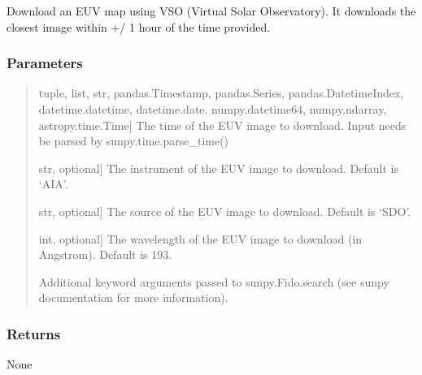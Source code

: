 \documentclass[letterpaper,10pt,english]{sphinxmanual}
\begin{document}
\begin{fulllineitems}
\begin{fulllineitems}
\end{fulllineitems}


\begin{fulllineitems}
\label{\detokenize{pycatch/pycatch:pycatch.pycatch.pycatch.download}}
\pysigstartsignatures
{}
\pysigstopsignatures
\sphinxAtStartPar
Download an EUV map using VSO (Virtual Solar Observatory). It downloads the closest image within +/\sphinxhyphen{} 1 hour of the time provided.


\subsubsection{Parameters}
\label{\detokenize{pycatch/pycatch:id13}}\begin{quote}
\begin{description}
\sphinxlineitem{time}{[}tuple, list, str, pandas.Timestamp, pandas.Series, pandas.DatetimeIndex, datetime.datetime, datetime.date, numpy.datetime64, numpy.ndarray, astropy.time.Time{]}
\sphinxAtStartPar
The time of the EUV image to download. Input needs be parsed by sunpy.time.parse\_time()

\sphinxlineitem{instrument}{[}str, optional{]}
\sphinxAtStartPar
The instrument of the EUV image to download. Default is ‘AIA’.

\sphinxlineitem{source}{[}str, optional{]}
\sphinxAtStartPar
The source of the EUV image to download. Default is ‘SDO’.

\sphinxlineitem{wavelength}{[}int, optional{]}
\sphinxAtStartPar
The wavelength of the EUV image to download (in Angstrom). Default is 193.

\sphinxAtStartPar
Additional keyword arguments passed to sunpy.Fido.search (see sunpy documentation for more information).

\end{description}
\end{quote}


\subsubsection{Returns}
\label{\detokenize{pycatch/pycatch:id14}}
\sphinxAtStartPar
None



\end{fulllineitems}
\end{fulllineitems}
\end{document}

